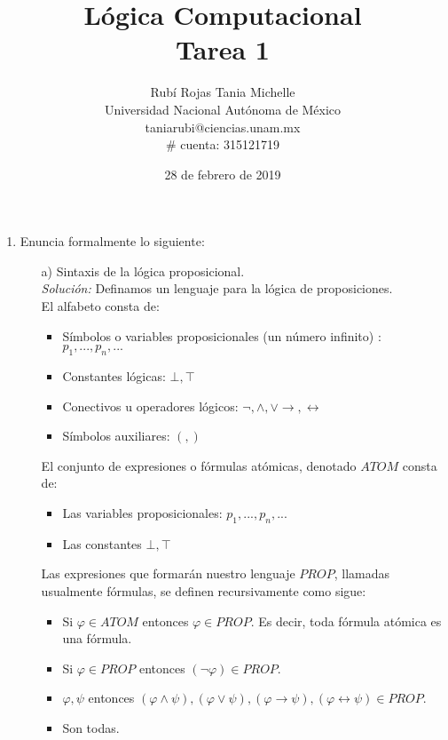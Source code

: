 \documentclass[letterpaper,10pt]{article}
\title{Lógica Computacional \\ Tarea 1}
\author{Rubí Rojas Tania Michelle \\
        Universidad Nacional Autónoma de México \\
        taniarubi@ciencias.unam.mx \\
        \# cuenta: 315121719}
\date{28 de febrero de 2019}
\begin{document}
    \maketitle

    \begin{enumerate}
        \item Enuncia formalmente lo siguiente:
        \begin{itemize}

            \item[a)] Sintaxis de la lógica proposicional. \\
            \textit{Solución:} Definamos un lenguaje para la lógica de
            proposiciones.  \\
            El alfabeto consta de:

            \begin{itemize}
                \item Símbolos o variables proposicionales (un número
                infinito) : $p_{1}, ... , p_{n}, ...$
                \item Constantes lógicas: $\bot, \top$
                \item Conectivos u operadores lógicos: $\neg, \land, \lor 
                \rightarrow, \leftrightarrow$
                \item Símbolos auxiliares: $(,)$
            \end{itemize}

            El conjunto de expresiones o fórmulas atómicas, denotado
            $ATOM$ consta de:

            \begin{itemize}
                \item Las variables proposicionales: $p_{1}, ..., p_{n}, ...$
                \item Las constantes $\bot, \top$
            \end{itemize}

            Las expresiones que formarán nuestro lenguaje $PROP$, llamadas
            usualmente fórmulas, se definen recursivamente como sigue:

            \begin{itemize}
                \item Si $\varphi \in ATOM$ entonces $\varphi \in PROP$. Es 
                decir, toda fórmula atómica es una fórmula.
                \item Si $\varphi \in PROP$ entonces 
                $(\neg \varphi) \in PROP$.
                \item $\varphi, \psi$ entonces $(\varphi \land \psi), 
                (\varphi \lor \psi), (\varphi \rightarrow \psi), 
                (\varphi \leftrightarrow \psi) \in PROP$.
                \item Son todas.
            \end{itemize}


\end{itemize}
\end{enumerate}
\end{document}
